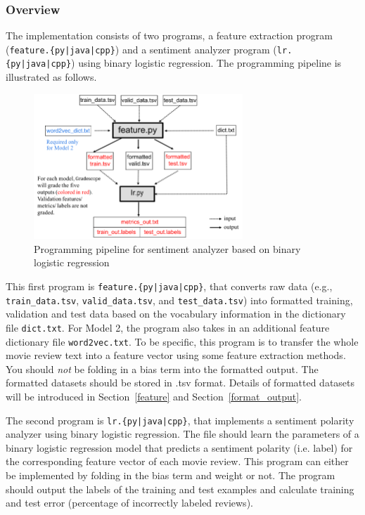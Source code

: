 \documentclass[11pt,addpoints,answers]{exam}
\begin{document}
\subsubsection{Overview}\label{overview}

The implementation consists of two programs, a feature extraction program (\texttt{feature.\{py|java|cpp\}}) and a sentiment analyzer program (\texttt{lr.\{py|java|cpp\}}) using binary logistic regression. The programming pipeline is illustrated as follows.

\begin{figure}[H]
        \centering
        \includegraphics[width = 0.7\textwidth]{Pipeline_v2.png}
        \caption{Programming pipeline for sentiment analyzer based on binary logistic regression}
        \label{pipeline}
\end{figure}


This first program is \texttt{feature.\{py|java|cpp\}}, that converts raw data (e.g., \lstinline{train_data.tsv}, \lstinline{valid_data.tsv}, and \lstinline{test_data.tsv}) into formatted training, validation and test data based on the vocabulary information in the dictionary file \lstinline{dict.txt}. For Model 2, the program also takes in an additional feature dictionary file \lstinline{word2vec.txt}. To be specific, this program is to transfer the whole movie review text into a feature vector using some feature extraction methods. You should \emph{not} be folding in a bias term into the formatted output.
The formatted datasets should be stored in .tsv format. Details of formatted datasets will be introduced in Section~\ref{feature} and Section~\ref{format_output}.

The second program is \texttt{lr.\{py|java|cpp\}}, that implements a sentiment polarity analyzer using binary logistic regression. The file should learn the parameters of a binary logistic regression model that predicts a sentiment polarity (i.e. label) for the corresponding feature vector of each movie review. This program can either be implemented by folding in the bias term and weight or not. The program should output the labels of the training and test examples and calculate training and test error (percentage of incorrectly labeled reviews). 
\end{document}
